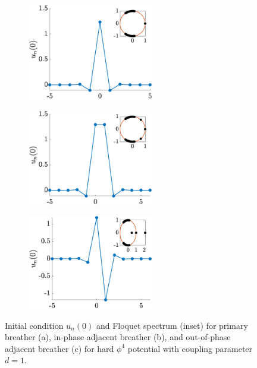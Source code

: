 \documentclass[12pt,reqno]{amsart}
\theoremstyle{definition}
\begin{document}
\begin{figure}
	\begin{center}
	\begin{subfigure}{0.3\linewidth}
		\caption{}
		\includegraphics[width=5.5cm]{phi4single.eps} \hspace{-0.5cm}
		\label{fig:phi4sola} 
	\end{subfigure}
	\begin{subfigure}{0.3\linewidth}
		\caption{}
		\includegraphics[width=5.5cm]{intersitephi4inphase.eps} \hspace{-0.5cm}
		\label{fig:phi4solb} 
	\end{subfigure}
	\begin{subfigure}{0.3\linewidth}
		\caption{}
		\includegraphics[width=5.5cm]{intersitephi4opposite.eps} 
		\label{fig:phi4solc} 
	\end{subfigure}
	\end{center}
	\caption{Initial condition $u_n(0)$ and Floquet spectrum (inset) for primary breather (a), in-phase adjacent breather (b), and out-of-phase adjacent breather (c) for hard $\phi^4$ potential with coupling parameter $d=1$. }
	\label{fig:phi4sol}
\end{figure}
\end{document}
